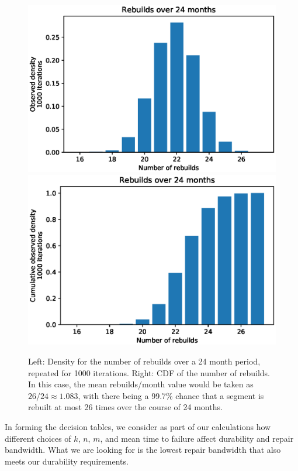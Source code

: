 \begin{figure}[!htbp]
    \centering
    \includegraphics[scale=0.5]{RS-appendix-files/example_pmf.eps}
    \includegraphics[scale=0.5]{RS-appendix-files/example_cdf.eps}
    \caption{Left: Density for the number of rebuilds over a 24 month period, repeated for 1000 iterations. Right: CDF of the number of rebuilds. In this case, the mean rebuilds/month value would be taken as $26/24\approx1.083$, with there being a 99.7\% chance that a segment is rebuilt at most 26 times over the course of 24 months.}
    \label{fig:sim_method}
\end{figure}

In forming the decision tables, we consider as part of our calculations how
different choices of $k$, $n$, $m$, and mean time to failure affect durability and repair bandwidth. What we are looking for is the lowest repair bandwidth that also meets our
durability requirements.




